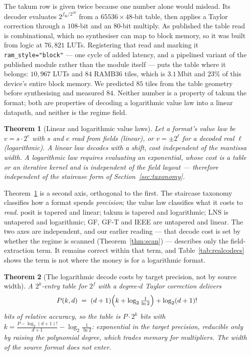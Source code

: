 \documentclass[11pt]{article}
\newtheorem{theorem}{Theorem}
\theoremstyle{definition}
\begin{document}
The takum row is given twice because one number alone would mislead. Its decoder
evaluates $2^{f_{\mathrm{hi}}/2^{16}}$ from a $65536 \times 48$-bit table, then
applies a Taylor correction through a $108$-bit and an $80$-bit multiply. As
published the table read is combinational, which no synthesiser can map to block
memory, so it was built from logic at $76{,}821$ LUTs. Registering that read and
marking it \texttt{ram\_style="block"} --- one cycle of added latency, and a
pipelined variant of the published module rather than the module itself --- puts
the table where it belongs: $10{,}967$ LUTs and $84$ RAMB36 tiles, which is
$3.1$\,Mbit and $23\%$ of this device's entire block memory. We predicted $85$
tiles from the table geometry before synthesising and measured $84$. Neither
number is a property of takum the format; both are properties of decoding a
logarithmic value law into a linear datapath, and neither is the regime field.

\begin{theorem}[Linear and logarithmic value laws]
\label{thm:valuelaw}
Let a format's value law be $v = s \cdot 2^{e}$ with $s$ and $e$ read from fields
(\emph{linear}), or $v = \pm 2^{\ell}$ for a decoded real $\ell$
(\emph{logarithmic}). A linear law decodes with a shift, cost independent of the
mantissa width. A logarithmic law requires evaluating an exponential, whose cost
is a table or an iterative kernel and is independent of the field layout ---
therefore independent of the staircase form of Section~\ref{sec:taxonomy}.
\end{theorem}

Theorem~\ref{thm:valuelaw} is a second axis, orthogonal to the first. The
staircase taxonomy classifies how a format spends \emph{precision}; the value law
classifies what it costs to \emph{read}. posit is tapered and linear; takum is
tapered and logarithmic; LNS is untapered and logarithmic; GF, GF-T and IEEE are
untapered and linear. The two axes are independent, and our earlier reading ---
that decode cost is set by whether the regime is scanned
(Theorem~\ref{thm:scan}) --- describes only the field-extraction term. It remains
correct within that term, and Table~\ref{tab:realcodecs} shows the term is not
where the money is for a logarithmic format.


\begin{theorem}[The logarithmic decode costs by target precision, not by source width]
\label{thm:targetprec}
A $2^{k}$-entry table for $2^{f}$ with a degree-$d$ Taylor correction delivers
\[
P(k,d) \;=\; (d+1)\Bigl(k + \log_2\tfrac{1}{\ln 2}\Bigr) + \log_2 (d+1)!
\]
bits of relative accuracy, so the table is $P \cdot 2^{k}$ bits with
$k = \frac{P - \log_2 (d+1)!}{d+1} - \log_2\frac{1}{\ln 2}$: exponential in the
target precision, reducible only by raising the polynomial degree, which trades
memory for multipliers. The width of the source format does not enter.
\end{theorem}
\end{document}
